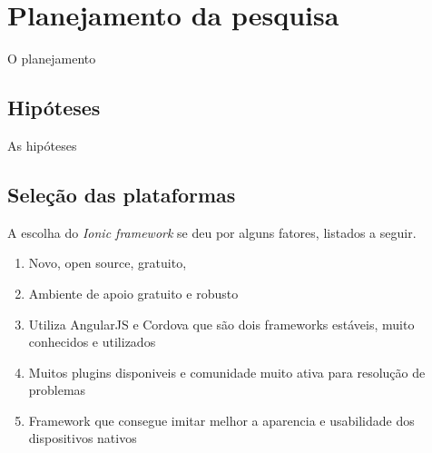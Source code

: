 \begin{comment}
Texto introdutório da seção -> Precisa?
ok - projeto feito com tais condicoes de equipe, tempo e equipamento
ok - agora vai ser feito com tais nova condicoes de equipe, tempo e equipamento
ok - pouco conhecimento em html, css e javascript
ok - pq o uso do mini farma, pq o código eh nosso, app pequeno, mas que usa varios recursos nativos do celular
pq o uso do ionic e nao de outra, criterios de escolha
será que aqui fala das versoes do ios, ionic, cordova, angularjs? sim e explicar pq nao escolheu a versao 2 do ionic, pq eh recente e estavel
\end{comment}

\section{Planejamento da pesquisa} \label{sec:planejamento}

O planejamento

\subsection{Hipóteses} \label{subsec:hipoteses}

As hipóteses

\subsection{Seleção das plataformas} \label{subsec:selecaodasplataformas}

A escolha do \textit{Ionic framework} se deu por alguns fatores, listados a seguir. 
\begin{enumerate}
    \item Novo, open source, gratuito,
    \item Ambiente de apoio gratuito e robusto
    \item Utiliza AngularJS e Cordova que são dois frameworks estáveis, muito conhecidos e utilizados
    \item Muitos plugins disponiveis e comunidade muito ativa para resolução de problemas %
    \item Framework que consegue imitar melhor a aparencia e usabilidade dos dispositivos nativos %
\end{enumerate}
 
\begin{comment}
Porque Ionic? Porque não, outro? Quais os criterios usados para escolher o Ionic?
Ionic é open source, gratuito, muito focado em performance e possui html e css otimizados para dispositivos móveis.
\end{comment}

